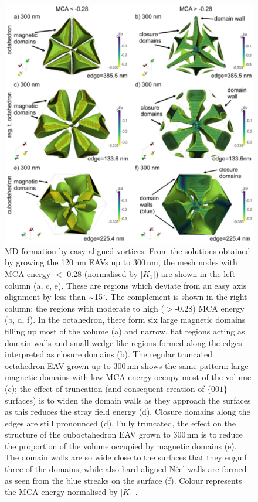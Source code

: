 \documentclass[review,authoryear]{elsarticle}
\newcommand{\roughly}{{\raise.17ex\hbox{$\scriptstyle\sim$}}}
\newcommand{\nm}{\,\text{nm}}
\begin{document}
\begin{figure}[ht]
\centering
\includegraphics[width=\textwidth]{Figure_06.pdf}
\caption{MD formation by easy aligned vortices. From the solutions obtained by growing the 120$\nm$ EAVs up to 300$\nm$, the mesh nodes with MCA energy $<$-0.28 (normalised by $|K_1|$) are shown in the left column (a, c, e). These are regions which deviate from an easy axis alignment by less than $\roughly$15$^{\circ}$. The complement is shown in the right column: the regions with moderate to high ($>$-0.28) MCA energy (b, d, f). In the octahedron, there form six large magnetic domains filling up most of the volume (a) and narrow, flat regions acting as domain walls and small wedge-like regions formed along the edges interpreted as closure domains (b). The regular truncated octahedron EAV grown up to 300$\nm$ shows the same pattern: large magnetic domains with low MCA energy occupy most of the volume (c); the effect of truncation (and consequent creation of $\{001\}$ surfaces) is to widen the domain walls as they approach the surfaces as this reduces the stray field energy (d). Closure domains along the edges are still pronounced (d). Fully truncated, the effect on the structure of the cuboctahedron EAV grown to 300$\nm$ is to reduce the proportion of the volume occupied by magnetic domains (e). The domain walls are so wide close to the surfaces that they engulf three of the domains, while also hard-aligned N\'eel walls are formed as seen from the blue streaks on the surface (f). Colour represents the MCA energy normalised by $|K_1|$.}
\label{fig6}
\end{figure}
\end{document}
